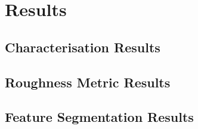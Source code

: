 \chapter{Results}
\label{ch:results}

\section{Characterisation Results}

\section{Roughness Metric Results}

\section{Feature Segmentation Results}

